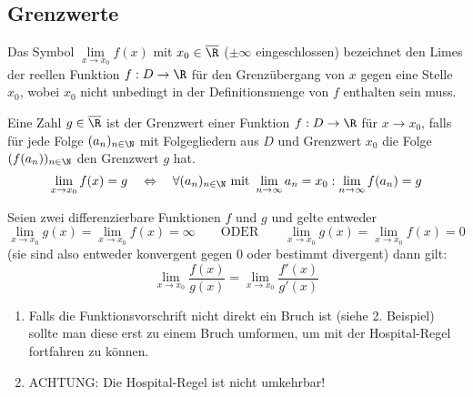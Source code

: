\documentclass[main.tex]{subfiles}
\begin{document}
\subsection{Grenzwerte}

\begin{Definition}
	Das Symbol $\lim\limits_{x \rightarrow x_{0}}f(x)$ mit $x_{0} \in \overline{\R}$ ($\pm \infty$ eingeschlossen) bezeichnet den Limes der reellen Funktion $f:D\rightarrow \R$ für den Grenzübergang von $x$ gegen eine Stelle $x_{0}$, wobei $x_{0}$ nicht unbedingt in der Definitionsmenge von $f$ enthalten sein muss.

	Eine Zahl $g \in \overline{\R}$ ist der Grenzwert einer Funktion $f:D\rightarrow \R$ für $x\rightarrow x_{0}$, falls für jede Folge $(a_{n})_{n\in \N}$ mit Folgegliedern aus $D$ und Grenzwert $x_{0}$ die Folge $(f(a_{n}))_{n\in \N}$ den Grenzwert $g$ hat.
	$$\lim\limits_{x \rightarrow x_{0}}f(x) = g \quad \Leftrightarrow \quad \forall (a_{n})_{n\in \N} \text{ mit } \lim\limits_{n \rightarrow \infty}a_{n}=x_{0} : \lim\limits_{n \rightarrow \infty}f(a_{n})=g$$
\end{Definition}

\begin{Theorem}
	Seien zwei differenzierbare Funktionen $f$ und $g$ und gelte entweder
	$$\lim\limits_{x \rightarrow x_{0}}g(x) = \lim\limits_{x \rightarrow x_{0}}f(x) = \infty \qquad \text{ODER} \qquad  \lim\limits_{x \rightarrow x_{0}}g(x) = \lim\limits_{x \rightarrow x_{0}}f(x) = 0$$
	(sie sind also entweder konvergent gegen $0$ oder bestimmt divergent) dann gilt:
	$$\lim\limits_{x \rightarrow x_{0}} \dfrac{f(x)}{g(x)} = \lim\limits_{x \rightarrow x_{0}}\dfrac{f'(x)}{g'(x)}$$
\end{Theorem}

\begin{Bemerkung}
	\begin{enumerate}
		\item Falls die Funktionsvorschrift nicht direkt ein Bruch ist (siehe 2. Beispiel) sollte man diese erst zu einem Bruch umformen, um mit der Hospital-Regel fortfahren zu können.
		\item ACHTUNG: Die Hospital-Regel ist nicht umkehrbar!
	\end{enumerate}
\end{Bemerkung}
\end{document}
